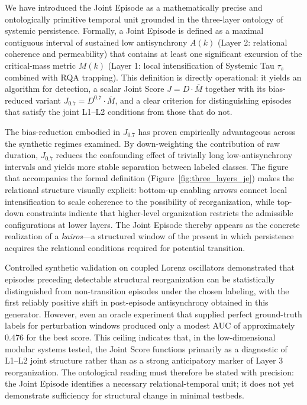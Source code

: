 We have introduced the Joint Episode as a mathematically precise and ontologically primitive temporal unit grounded in the three-layer ontology of systemic persistence. Formally, a Joint Episode is defined as a maximal contiguous interval of sustained low antisynchrony $A(k)$ (Layer 2: relational coherence and permeability) that contains at least one significant excursion of the critical-mass metric $M(k)$ (Layer 1: local intensification of Systemic Tau $\tau_s$ combined with RQA trapping). This definition is directly operational: it yields an algorithm for detection, a scalar Joint Score $J = D \cdot \overline{M}$ together with its bias-reduced variant $J_{0.7} = D^{0.7} \cdot \overline{M}$, and a clear criterion for distinguishing episodes that satisfy the joint L1--L2 conditions from those that do not.

The bias-reduction embodied in $J_{0.7}$ has proven empirically advantageous across the synthetic regimes examined. By down-weighting the contribution of raw duration, $J_{0.7}$ reduces the confounding effect of trivially long low-antisynchrony intervals and yields more stable separation between labeled classes. The figure that accompanies the formal definition (Figure~\ref{fig:three_layers_je}) makes the relational structure visually explicit: bottom-up enabling arrows connect local intensification to scale coherence to the possibility of reorganization, while top-down constraints indicate that higher-level organization restricts the admissible configurations at lower layers. The Joint Episode thereby appears as the concrete realization of a \textit{kairos}---a structured window of the present in which persistence acquires the relational conditions required for potential transition.

Controlled synthetic validation on coupled Lorenz oscillators demonstrated that episodes preceding detectable structural reorganization can be statistically distinguished from non-transition episodes under the chosen labeling, with the first reliably positive shift in post-episode antisynchrony obtained in this generator. However, even an oracle experiment that supplied perfect ground-truth labels for perturbation windows produced only a modest AUC of approximately 0.476 for the best score. This ceiling indicates that, in the low-dimensional modular systems tested, the Joint Score functions primarily as a diagnostic of L1--L2 joint structure rather than as a strong anticipatory marker of Layer 3 reorganization. The ontological reading must therefore be stated with precision: the Joint Episode identifies a necessary relational-temporal unit; it does not yet demonstrate sufficiency for structural change in minimal testbeds.

